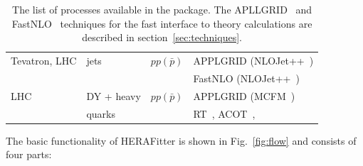 \begin{table}
\begin{tabular}{|l|l|l|l|}
Tevatron, LHC &jets &$pp(\bar p)$ & APPLGRID (NLOJet++~\cite{Nagy:1998bb,Nagy:2001fj}) \\
                &  & & FastNLO (NLOJet++~\cite{Nagy:1998bb,Nagy:2001fj}) \\
LHC& DY + heavy &$pp(\bar p)$ & APPLGRID (MCFM~\cite{Campbell:1999ah,Campbell:2000je,Campbell:2010ff}) \\
   & quarks     &                 & RT~\cite{Thorne:1997ga,Thorne:2006qt,Martin:epC63,Thorne:6180}, ACOT~\cite{CWZ}, \\
\hline
\end{tabular}
\caption{The list of processes available in the \fitter package. 
The APLLGRID~\cite{Carli:2010rw} and FastNLO~\cite{Kluge:2006xs,Wobisch:2011ij,Britzger:2012bs} 
techniques for the fast interface to theory calculations are described in section~\ref{sec:techniques}.} 
\label{tab:proc}
\end{table}
%
\normalsize
The basic functionality of HERAFitter is shown in Fig.~\ref{fig:flow} and consists of four parts: %

